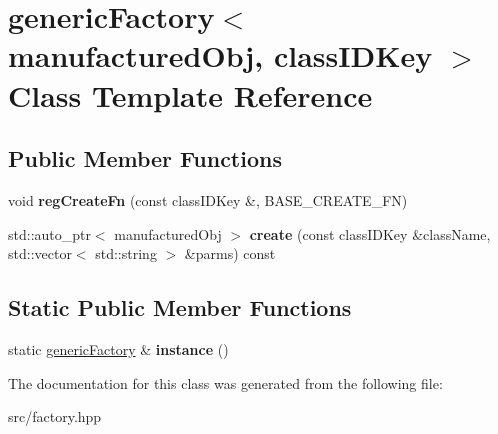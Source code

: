 \hypertarget{classgenericFactory}{}\section{generic\+Factory$<$ manufactured\+Obj, class\+I\+D\+Key $>$ Class Template Reference}
\label{classgenericFactory}
\subsection*{Public Member Functions}
\begin{DoxyCompactItemize}
\item 
void {\bfseries reg\+Create\+Fn} (const class\+I\+D\+Key \&, B\+A\+S\+E\+\_\+\+C\+R\+E\+A\+T\+E\+\_\+\+FN)\hypertarget{classgenericFactory_a60c9c45b432cf2dcc7717891154076d4}{}\label{classgenericFactory_a60c9c45b432cf2dcc7717891154076d4}

\item 
std\+::auto\+\_\+ptr$<$ manufactured\+Obj $>$ {\bfseries create} (const class\+I\+D\+Key \&class\+Name, std\+::vector$<$ std\+::string $>$ \&parms) const \hypertarget{classgenericFactory_a898535fe720239de3d5ba3b709b10934}{}\label{classgenericFactory_a898535fe720239de3d5ba3b709b10934}

\end{DoxyCompactItemize}
\subsection*{Static Public Member Functions}
\begin{DoxyCompactItemize}
\item 
static \hyperlink{classgenericFactory}{generic\+Factory} \& {\bfseries instance} ()\hypertarget{classgenericFactory_a38e994a8e2e768f19d0bbb9f6bb08a73}{}\label{classgenericFactory_a38e994a8e2e768f19d0bbb9f6bb08a73}

\end{DoxyCompactItemize}


The documentation for this class was generated from the following file\+:\begin{DoxyCompactItemize}
\item 
src/factory.\+hpp\end{DoxyCompactItemize}

